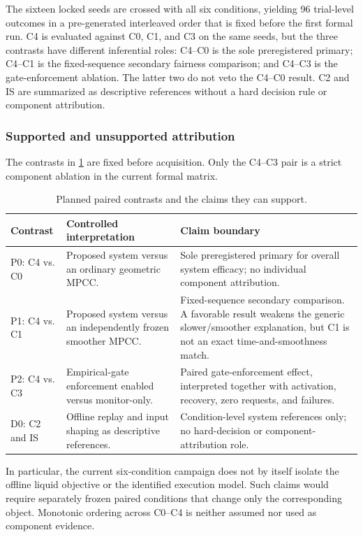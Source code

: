 The sixteen locked seeds are crossed with all six conditions, yielding 96
trial-level outcomes in a pre-generated interleaved order that is fixed before
the first formal run.  C4 is evaluated against C0, C1, and C3 on the same
seeds, but the three contrasts
have different inferential roles: C4--C0 is the sole preregistered primary;
C4--C1 is the fixed-sequence secondary fairness comparison; and C4--C3 is the
gate-enforcement ablation.  The latter two do not veto the C4--C0 result. C2
and IS are summarized as descriptive references without a hard decision rule
or component attribution.

\subsubsection{Supported and unsupported attribution}

The contrasts in \cref{tab:ablations} are fixed before acquisition.  Only the
C4--C3 pair is a strict component ablation in the current formal matrix.

\begin{table}[t]
  \centering
  \caption{Planned paired contrasts and the claims they can support.}
  \label{tab:ablations}
  \small
  \begin{tabular}{@{}p{}p{}p{}@{}}
    \toprule
    Contrast & Controlled interpretation & Claim boundary \\
    \midrule
    P0: C4 vs. C0 & Proposed system versus an ordinary geometric MPCC. & Sole preregistered primary for overall system efficacy; no individual component attribution. \\
    P1: C4 vs. C1 & Proposed system versus an independently frozen smoother MPCC. & Fixed-sequence secondary comparison. A favorable result weakens the generic slower/smoother explanation, but C1 is not an exact time-and-smoothness match. \\
    P2: C4 vs. C3 & Empirical-gate enforcement enabled versus monitor-only. & Paired gate-enforcement effect, interpreted together with activation, recovery, zero requests, and failures. \\
    D0: C2 and IS & Offline replay and input shaping as descriptive references. & Condition-level system references only; no hard-decision or component-attribution role. \\
    \bottomrule
  \end{tabular}
\end{table}

In particular, the current six-condition campaign does not by itself isolate
the offline liquid objective or the identified execution model.  Such claims
would require separately frozen paired conditions that change only the
corresponding object.  Monotonic ordering across C0--C4 is neither assumed nor
used as component evidence.

